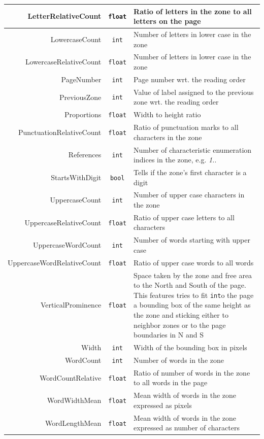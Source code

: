 \begin{appendix}
\begin{longtable}[c]{|r|c|p{8cm}|}
LetterRelativeCount & \verb+float+ & Ratio of letters in the zone to all letters on the page\\ \hline
LowercaseCount & \verb+int+ & Number of letters in lower case in the zone\\ \hline
LowercaseRelativeCount & \verb+float+ & Number of letters in lower case in the zone\\ \hline
PageNumber & \verb+int+ & Page number wrt. the reading order \\ \hline
PreviousZone & \verb+int+ & Value of label assigned to the previous zone wrt. the reading order\\ \hline
Proportions & \verb+float+ & Width to height ratio\\ \hline
PunctuationRelativeCount & \verb+float+ & Ratio of punctuation marks to all characters in the zone\\ \hline
References & \verb+int+ & Number of characteristic enumeration indices in the zone, e.g. \textit{1.}.\\ \hline
StartsWithDigit & \verb+bool+ & Tells if the zone's first character is a digit\\ \hline
UppercaseCount & \verb+int+ & Number of upper case characters in the zone \\ \hline
UppercaseRelativeCount & \verb+float+ & Ratio of upper case letters to all characters\\ \hline
UppercaseWordCount & \verb+int+ & Number of words starting with upper case\\ \hline
UppercaseWordRelativeCount & \verb+float+ & Ratio of upper case words to all words\\ \hline
VerticalProminence & \verb+float+ & Space taken by the zone and free area to the North and South of the page. This features tries to fit \verb+int+o the page a bounding box of the same height as the zone and sticking either to neighbor zones or to the page boundaries in N and S \\ \hline
Width & \verb+int+ & Width of the bounding box in pixels\\ \hline
WordCount & \verb+int+ & Number of words in the zone\\ \hline
WordCountRelative & \verb+float+ & Ratio of number of words in the zone to all words in the page\\ \hline
WordWidthMean & \verb+float+ & Mean width of words in the zone expressed as pixels\\ \hline
WordLengthMean & \verb+float+ & Mean width of words in the zone expressed as number of characters\\ \hline

\end{longtable}
\end{appendix}
